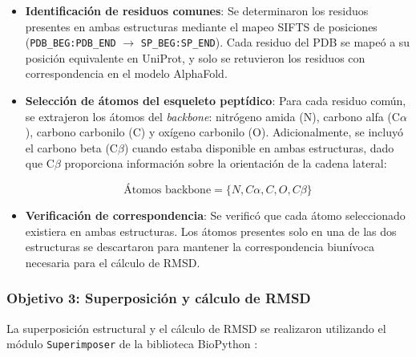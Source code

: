 \begin{itemize}
    \item \textbf{Identificaci\'on de residuos comunes}: Se determinaron los residuos presentes en ambas estructuras mediante el mapeo SIFTS de posiciones (\texttt{PDB\_BEG:PDB\_END} $\rightarrow$ \texttt{SP\_BEG:SP\_END}). Cada residuo del PDB se mape\'o a su posici\'on equivalente en UniProt, y solo se retuvieron los residuos con correspondencia en el modelo AlphaFold.

    \item \textbf{Selecci\'on de \'atomos del esqueleto pept\'idico}: Para cada residuo com\'un, se extrajeron los \'atomos del \textit{backbone}: nitr\'ogeno amida (N), carbono alfa (C$\alpha$), carbono carbonilo (C) y ox\'igeno carbonilo (O). Adicionalmente, se incluy\'o el carbono beta (C$\beta$) cuando estaba disponible en ambas estructuras, dado que C$\beta$ proporciona informaci\'on sobre la orientaci\'on de la cadena lateral:

    \begin{equation}
        \text{\'Atomos backbone} = \{N, C\alpha, C, O, C\beta\}
        \label{eq:atomos_backbone}
    \end{equation}

    \item \textbf{Verificaci\'on de correspondencia}: Se verific\'o que cada \'atomo seleccionado existiera en ambas estructuras. Los \'atomos presentes solo en una de las dos estructuras se descartaron para mantener la correspondencia biun\'ivoca necesaria para el c\'alculo de RMSD.
\end{itemize}

\subsubsection{Objetivo 3: Superposici\'on y c\'alculo de RMSD}
\label{subsubsec:superposicion}

La superposici\'on estructural y el c\'alculo de RMSD se realizaron utilizando el m\'odulo \texttt{Superimposer} de la biblioteca BioPython \citep{cock2009biopython}:

